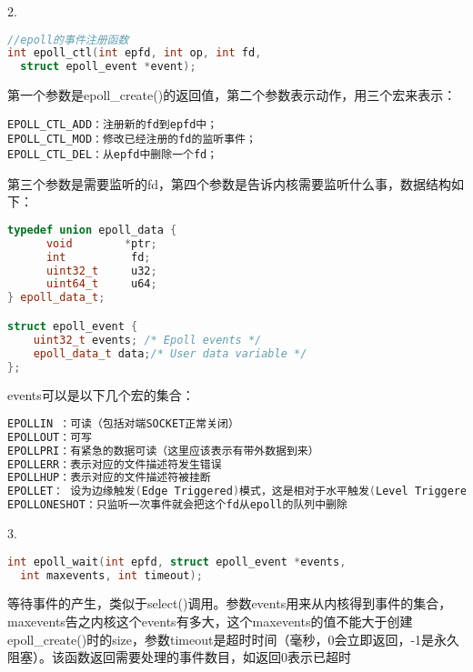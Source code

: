2.
\begin{lstlisting}[language=C++]
//epoll的事件注册函数
int epoll_ctl(int epfd, int op, int fd, 
  struct epoll_event *event);
\end{lstlisting}
第一个参数是epoll\_create()的返回值，第二个参数表示动作，用三个宏来表示：
\begin{verbatim}
EPOLL_CTL_ADD：注册新的fd到epfd中；
EPOLL_CTL_MOD：修改已经注册的fd的监听事件；
EPOLL_CTL_DEL：从epfd中删除一个fd；
\end{verbatim}
第三个参数是需要监听的fd，第四个参数是告诉内核需要监听什么事，数据结构如下：
\begin{lstlisting}[language=C++]
typedef union epoll_data {
      void        *ptr;
      int          fd;
      uint32_t     u32;
      uint64_t     u64;
} epoll_data_t;

struct epoll_event {
    uint32_t events; /* Epoll events */
    epoll_data_t data;/* User data variable */
};
\end{lstlisting}
events可以是以下几个宏的集合：
\begin{lstlisting}[language=C++]
EPOLLIN ：可读（包括对端SOCKET正常关闭）
EPOLLOUT：可写
EPOLLPRI：有紧急的数据可读（这里应该表示有带外数据到来）
EPOLLERR：表示对应的文件描述符发生错误
EPOLLHUP：表示对应的文件描述符被挂断
EPOLLET： 设为边缘触发(Edge Triggered)模式，这是相对于水平触发(Level Triggered)来说的
EPOLLONESHOT：只监听一次事件就会把这个fd从epoll的队列中删除
\end{lstlisting}


3.
\begin{lstlisting}[language=C++]
int epoll_wait(int epfd, struct epoll_event *events, 
  int maxevents, int timeout);
\end{lstlisting}
等待事件的产生，类似于select()调用。参数events用来从内核得到事件的集合，maxevents告之内核这个events有多大，这个maxevents的值不能大于创建epoll\_create()时的size，参数timeout是超时时间（毫秒，0会立即返回，-1是永久阻塞）。该函数返回需要处理的事件数目，如返回0表示已超时















